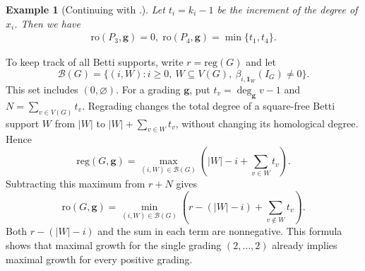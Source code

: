 \documentclass[dvipsnames,10pt]{article}
\newtheorem{example}[theorem]{Example}
\newtheorem{remark}[theorem]{Remark}
\newcommand{\gb}[1]{{\color{red} \textup{(\!(GB: #1)\!)}}}
\begin{document}
\begin{example}
    [Continuing with .] Let $t_i=k_i-1$ be the increment of the degree of $x_i$. Then we have
    \begin{align*}
        \mathrm{ro}(P_3,\mathbf{g}) = 0,\;\mathrm{ro}(P_4,\mathbf{g}) = \min\{t_1,t_4\}.
    \end{align*}
\end{example}

To keep track of all Betti supports, write $r=\mathrm{reg}(G)$ and let
\[
    \mathcal{B}(G)=\{(i,W):i\geq0,\ W\subseteq V(G),\ \beta_{i,\mathbf{1}_W}(I_G)\neq0\}.
\]
This set includes $(0,\varnothing)$. For a grading $\mathbf{g}$, put $t_v=\deg_{\mathbf{g}}v-1$ and $N=\sum_{v\in V(G)}t_v$. Regrading changes the total degree of a square-free Betti support $W$ from $|W|$ to $|W|+\sum_{v\in W}t_v$, without changing its homological degree. Hence
\begin{equation}\label{eq:weighted-supports}
    \mathrm{reg}(G,\mathbf{g})
    =\max_{(i,W)\in\mathcal{B}(G)}
      \left(|W|-i+\sum_{v\in W}t_v\right).
\end{equation}
Subtracting this maximum from $r+N$ gives
\begin{equation}\label{eq:offset-supports}
    \mathrm{ro}(G,\mathbf{g})
    =\min_{(i,W)\in\mathcal{B}(G)}
      \left(r-(|W|-i)+\sum_{v\notin W}t_v\right).
\end{equation}
Both $r-(|W|-i)$ and the sum in each term are nonnegative. This formula shows that maximal growth for the single grading $(2,\ldots,2)$ already implies maximal growth for every positive grading.
\end{document}
